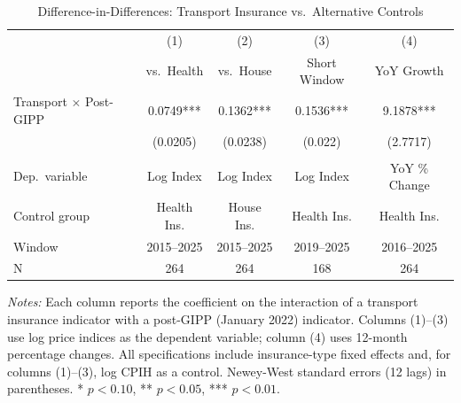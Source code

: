 \begin{table}[H]
\centering
\caption{Difference-in-Differences: Transport Insurance vs.\ Alternative Controls}
\label{tab:main}
\begin{threeparttable}
\begin{tabular}{lcccc}
\toprule
 & (1) & (2) & (3) & (4) \\
 & vs.\ Health & vs.\ House & Short Window & YoY Growth \\
\midrule
Transport $\times$ Post-GIPP & 0.0749*** & 0.1362*** & 0.1536*** & 9.1878*** \\
 & (0.0205) & (0.0238) & (0.022) & (2.7717) \\
\\
Dep.\ variable & Log Index & Log Index & Log Index & YoY \% Change \\
Control group & Health Ins. & House Ins. & Health Ins. & Health Ins. \\
Window & 2015--2025 & 2015--2025 & 2019--2025 & 2016--2025 \\
N & 264 & 264 & 168 & 264 \\
\bottomrule
\end{tabular}
\begin{tablenotes}[flushleft]
\small
\item \textit{Notes:} Each column reports the coefficient on the interaction of a transport insurance indicator with a post-GIPP (January 2022) indicator. Columns (1)--(3) use log price indices as the dependent variable; column (4) uses 12-month percentage changes. All specifications include insurance-type fixed effects and, for columns (1)--(3), log CPIH as a control. Newey-West standard errors (12 lags) in parentheses. * $p<0.10$, ** $p<0.05$, *** $p<0.01$.
\end{tablenotes}
\end{threeparttable}
\end{table}
